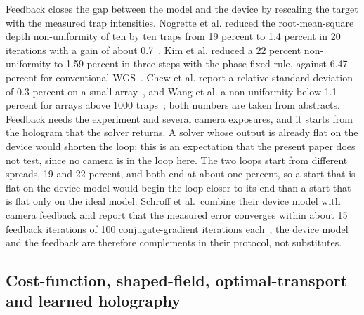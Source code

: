 Feedback closes the gap between the model and the device by rescaling the target with the measured trap intensities. Nogrette et al. reduced the root-mean-square depth non-uniformity of ten by ten traps from 19 percent to 1.4 percent in 20
iterations with a gain of about 0.7~\cite{nogrette}. Kim et al. reduced a 22 percent non-uniformity to 1.59 percent in three steps with the phase-fixed rule, against 6.47 percent for conventional WGS~\cite{kim2019}. Chew et al. report a
relative standard deviation of 0.3 percent on a small array~\cite{chew}, and Wang et al. a non-uniformity below 1.1 percent for arrays above 1000 traps~\cite{wang}; both numbers are taken from abstracts. Feedback needs the experiment
and several camera exposures, and it starts from the hologram that the solver returns. A solver whose output is already flat on the device would shorten the loop; this is an expectation that the present paper does not test, since no
camera is in the loop here. The two loops start from different spreads, 19 and 22 percent, and both end at about one percent, so a start that is flat on the device model would begin the loop closer to its end than a start that is flat only on the ideal model. Schroff et al.\ combine their device model with camera feedback and report that the measured error converges within about 15 feedback iterations of 100 conjugate-gradient iterations each~\cite{schroff}; the device model and the feedback are therefore complements in their protocol, not substitutes.

\subsection{Cost-function, shaped-field, optimal-transport and learned holography}

